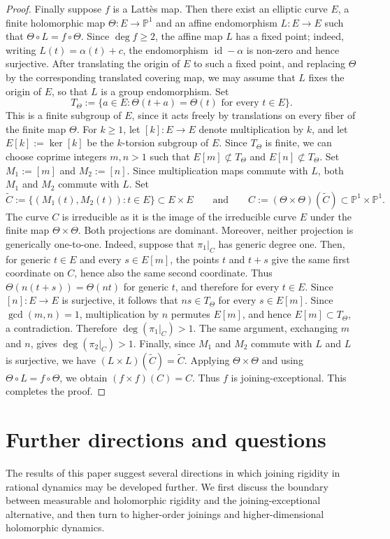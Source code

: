 \documentclass[11pt]{amsart}
\numberwithin{equation}{section}
\theoremstyle{plain}
\theoremstyle{definition}
\theoremstyle{remark}
\begin{document}
\begin{proof}
Finally suppose $f$ is a Latt\`es map. Then there exist an elliptic
curve $E$, a finite holomorphic map $\Theta\colon E\to\mathbb P^1$ and
an affine endomorphism $L\colon E\to E$ such that
$\Theta\circ L=f\circ\Theta$. Since $\deg f\geq2$, the affine map $L$
has a fixed point; indeed, writing $L(t)=\alpha(t)+c$, the endomorphism
$\operatorname{id}-\alpha$ is non-zero and hence surjective. After
translating the origin of $E$ to such a fixed point, and replacing
$\Theta$ by the corresponding translated covering map, we may assume
that $L$ fixes the origin of $E$, so that $L$ is a group endomorphism.
Set
$$
T_\Theta:=\{a\in E:\Theta(t+a)=\Theta(t)\text{ for every }t\in E\}.
$$
This is a finite subgroup of $E$, since it acts freely by translations
on every fiber of the finite map $\Theta$. 
For $k\geq 1$, let $[k]\colon E\to E$ denote multiplication by $k$,
and let $E[k]:=\ker [k]$ be the $k$-torsion subgroup of $E$.
Since $T_\Theta$ is finite,
we can choose coprime integers $m,n>1$ such that
$E[m]\not\subset T_\Theta$ and $E[n]\not\subset T_\Theta$. Set
$M_1:=[m]$ and $M_2:=[n]$. Since multiplication maps commute with $L$,
both $M_1$ and $M_2$ commute with $L$. Set
$$
\widetilde C:=\{(M_1(t),M_2(t)):t\in E\}\subset E\times E
\qquad
\text{and}
\qquad
C:=(\Theta\times\Theta)(\widetilde C)\subset\mathbb P^1\times\mathbb P^1.
$$
The curve $C$ is irreducible as it is the image of the irreducible
curve $E$ under the finite map $\Theta\times\Theta$. Both projections
are dominant. Moreover, neither projection is generically one-to-one.
Indeed, suppose that $\pi_1|_C$ has generic degree one. Then, for generic
$t\in E$ and every $s\in E[m]$, the points $t$ and $t+s$ give the same
first coordinate on $C$, hence also the same second coordinate. Thus
$\Theta(n(t+s))=\Theta(nt)$ for generic $t$, and therefore for every
$t\in E$. Since $[n]\colon E\to E$ is surjective, it follows that
$ns\in T_\Theta$ for every $s\in E[m]$. Since $\gcd(m,n)=1$,
multiplication by $n$ permutes $E[m]$, and hence $E[m]\subset T_\Theta$,
a contradiction. Therefore $\deg(\pi_1|_C)>1$. The same argument,
exchanging $m$ and $n$, gives $\deg(\pi_2|_C)>1$. Finally, since $M_1$
and $M_2$ commute with $L$ and $L$ is surjective, we have
$(L\times L)(\widetilde C)=\widetilde C$. Applying
$\Theta\times\Theta$ and using $\Theta\circ L=f\circ\Theta$, we obtain
$(f\times f)(C)=C$. Thus $f$ is joining-exceptional.
This completes the proof.
\end{proof}


\section{Further directions and questions}
\label{sec:further-questions}
The results of this paper suggest several directions in which joining
rigidity in rational dynamics may be developed further. We first
discuss the boundary between measurable and holomorphic rigidity and
the joining-exceptional alternative, and then turn to higher-order
joinings and higher-dimensional holomorphic dynamics.
\end{document}
